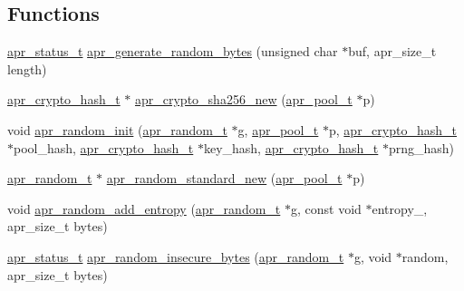 \subsection*{Functions}
\begin{DoxyCompactItemize}
\item 
\hyperlink{group__apr__errno_gaf76ee4543247e9fb3f3546203e590a6c}{apr\+\_\+status\+\_\+t} \hyperlink{group__apr__random_ga564e4c380e820a9b0d9e877d4852a65e}{apr\+\_\+generate\+\_\+random\+\_\+bytes} (unsigned char $\ast$buf, apr\+\_\+size\+\_\+t length)
\item 
\hyperlink{structapr__crypto__hash__t}{apr\+\_\+crypto\+\_\+hash\+\_\+t} $\ast$ \hyperlink{group__apr__random_gae992c6f642e9661d2417cd8f2df8d345}{apr\+\_\+crypto\+\_\+sha256\+\_\+new} (\hyperlink{group__apr__pools_gaf137f28edcf9a086cd6bc36c20d7cdfb}{apr\+\_\+pool\+\_\+t} $\ast$p)
\item 
void \hyperlink{group__apr__random_ga0184a90774212132f883c463811aacdc}{apr\+\_\+random\+\_\+init} (\hyperlink{group__apr__random_ga33073741e56b1bafe52ba58cefcbbf96}{apr\+\_\+random\+\_\+t} $\ast$g, \hyperlink{group__apr__pools_gaf137f28edcf9a086cd6bc36c20d7cdfb}{apr\+\_\+pool\+\_\+t} $\ast$p, \hyperlink{structapr__crypto__hash__t}{apr\+\_\+crypto\+\_\+hash\+\_\+t} $\ast$pool\+\_\+hash, \hyperlink{structapr__crypto__hash__t}{apr\+\_\+crypto\+\_\+hash\+\_\+t} $\ast$key\+\_\+hash, \hyperlink{structapr__crypto__hash__t}{apr\+\_\+crypto\+\_\+hash\+\_\+t} $\ast$prng\+\_\+hash)
\item 
\hyperlink{group__apr__random_ga33073741e56b1bafe52ba58cefcbbf96}{apr\+\_\+random\+\_\+t} $\ast$ \hyperlink{group__apr__random_ga7a73c9bcf026b63847aeae483c53191f}{apr\+\_\+random\+\_\+standard\+\_\+new} (\hyperlink{group__apr__pools_gaf137f28edcf9a086cd6bc36c20d7cdfb}{apr\+\_\+pool\+\_\+t} $\ast$p)
\item 
void \hyperlink{group__apr__random_ga8cf2875644c1dffc0c336289bd370efb}{apr\+\_\+random\+\_\+add\+\_\+entropy} (\hyperlink{group__apr__random_ga33073741e56b1bafe52ba58cefcbbf96}{apr\+\_\+random\+\_\+t} $\ast$g, const void $\ast$entropy\+\_\+, apr\+\_\+size\+\_\+t bytes)
\item 
\hyperlink{group__apr__errno_gaf76ee4543247e9fb3f3546203e590a6c}{apr\+\_\+status\+\_\+t} \hyperlink{group__apr__random_gab9a63359bb9543d746e6fd46933b7256}{apr\+\_\+random\+\_\+insecure\+\_\+bytes} (\hyperlink{group__apr__random_ga33073741e56b1bafe52ba58cefcbbf96}{apr\+\_\+random\+\_\+t} $\ast$g, void $\ast$random, apr\+\_\+size\+\_\+t bytes)
\item 

\end{DoxyCompactItemize}
